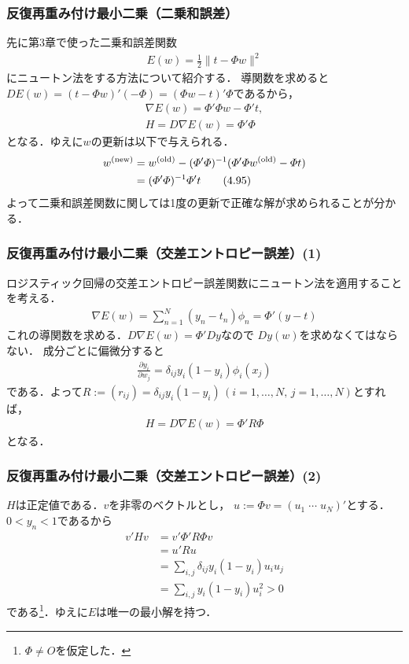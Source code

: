 \documentclass[10pt,%
hyperref={unicode}]{beamer}
\begin{document}
\begin{frame}
    \frametitle{反復再重み付け最小二乗（二乗和誤差）}
    先に第3章で使った二乗和誤差関数
    \begin{align*}
        E(w) = \frac{1}{2}\|t - \varPhi w\|^2
    \end{align*}
    にニュートン法をする方法について紹介する．
    導関数を求めると$DE(w) = (t - \varPhi w)'(-\varPhi) = (\varPhi w - t)'\varPhi$であるから，
    \begin{gather}
        \nabla E(w) = \varPhi'\varPhi w - \varPhi' t, \tag{4.93} \\
        H = D \nabla E(w) = \varPhi'\varPhi \tag{4.94}
    \end{gather}
    となる．ゆえに$w$の更新は以下で与えられる．
    \begin{align}
        w^{\mathrm{(new)}} &= w^{\mathrm{(old)}} - (\varPhi'\varPhi)^{-1}
                                (\varPhi' \varPhi w^{\mathrm{(old)}} - \varPhi t) \notag \\
                            &= (\varPhi'\varPhi)^{-1}\varPhi't \tag{4.95}
    \end{align}
    よって二乗和誤差関数に関しては1度の更新で正確な解が求められることが分かる．
\end{frame}

\begin{frame}
    \frametitle{反復再重み付け最小二乗（交差エントロピー誤差）(1)}
    ロジスティック回帰の交差エントロピー誤差関数にニュートン法を適用することを考える．
    \begin{align}
        \nabla E(w) = \sum_{n = 1}^N (y_n - t_n) \phi_n = \varPhi'(y - t) \tag{4.96}
    \end{align}
    これの導関数を求める．$D\nabla E(w)=\varPhi'Dy$なので
    $Dy(w)$を求めなくてはならない．
    成分ごとに偏微分すると
    \begin{align*}
        \frac{\partial y_i}{\partial w_j} = \delta_{ij}y_i(1 - y_i)\phi_i(x_j)
    \end{align*}
    である．よって$R := (r_{ij}) = \delta_{ij}y_i(1 - y_i)\,(i=1,\ldots,N,\,j = 1,\ldots,N)$とすれば，
    \begin{align}
        H = D \nabla E(w) = \varPhi'R\varPhi \tag{4.97}
    \end{align}
    となる．
\end{frame}

\begin{frame}
    \frametitle{反復再重み付け最小二乗（交差エントロピー誤差）(2)}
    $H$は正定値である．$v$を非零のベクトルとし，
    $u := \varPhi v = (u_1 \; \cdots \; u_N)'$とする．
    $0 < y_n < 1$であるから
    \begin{align*}
        v'Hv &= v'\varPhi'R\varPhi v \\
             &= u'Ru \\
             &= \sum_{i,j} \delta_{ij}y_i (1 - y_i) u_i u_j \\
             &= \sum_{i,j} y_i (1 - y_i) u_i^2 > 0
    \end{align*}
    である\footnote{$\varPhi \neq O$を仮定した．}．ゆえに$E$は唯一の最小解を持つ．
\end{frame}
\end{document}
